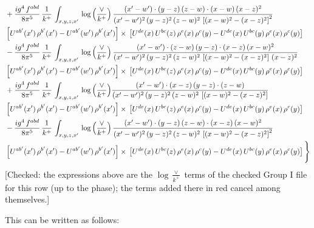 \documentclass[9pt]{article}
\numberwithin{equation}{section}
\begin{document}
\begin{align}
& +\frac{ig^{4}\, f^{abd}}{8\pi^{5}}\, \frac{1}{k^{+}}\, \int_{x,y,z,x'}\,\log{\left(\frac{\vee}{k^{+}}\right)}\,\frac{(x'-w')\cdot  (y-z)\, (z-w)\cdot (x-w)\, (x-z)^{2}}{(x'-w')^{2}\, (y-z)^{2}\, (z-w)^{2}\,\left[(x-w)^{2}-(x-z)^{2}\right]^{2}}\, \notag \\ & \left[U^{ab'}(x')\,\rho^{b'}(x')-U^{ab'}(w')\, \rho^{b'}(x')\right]\times\,\left[U^{de}(x)\,U^{bc}(z)\, \rho^{e}(x)\,\rho^{c}(y)-U^{de}(x)\,U^{bc}(y)\,\rho^{e}(x)\,\rho^{c}(y)\right] \notag \\
& - \frac{ig^{4}\, f^{abd}}{8\pi^{5}}\, \frac{1}{k^{+}}\, \int_{x,y,z,x'}\,\log{\left(\frac{\vee}{k^{+}}\right)}\,\frac{(x'-w')\cdot (z-w)\, (y-z)\cdot (x-z)\, (x-w)^{2}}{(x'-w')^{2}\, (y-z)^{2}\, (z-w)^{2}\,\left[(x-w)^{2} - (x-z)^{2}\right]\, (x-z)^{2}}\, \notag \\ & \left[U^{ab'}(x')\,\rho^{b'}(x')-U^{ab'}(w')\, \rho^{b'}(x')\right]\times\,\left[U^{de}(x)\,U^{bc}(z)\, \rho^{e}(x)\,\rho^{c}(y)-U^{de}(x)\,U^{bc}(y)\,\rho^{e}(x)\,\rho^{c}(y)\right] \notag \\
& +\frac{ig^{4}\, f^{abd}}{8\pi^{5}}\, \frac{1}{k^{+}}\, \int_{x,y,z,x'}\,\log{\left(\frac{\vee}{k^{+}}\right)}\frac{(x'-w')\cdot (x-z)\, (y-z)\cdot (z-w)}{(x'-w')^{2}\, (y-z)^{2}\, (z-w)^{2}\,\left[(x-w)^{2} -(x-z)^{2}\right]}\, \notag \\ & \left[U^{ab'}(x')\,\rho^{b'}(x')-U^{ab'}(w')\, \rho^{b'}(x')\right]\times\,\left[U^{de}(x)\,U^{bc}(z)\, \rho^{e}(x)\,\rho^{c}(y)-U^{de}(x)\,U^{bc}(y)\,\rho^{e}(x)\,\rho^{c}(y)\right] \notag \\
& -\frac{ig^{4}\, f^{abd}}{8\pi^{5}}\, \frac{1}{k^{+}}\, \int_{x,y,z,x'}\,\log{\left(\frac{\vee}{k^{+}}\right)}\,\frac{(x'-w')\cdot (y-z)\, (z-w)\cdot (x-z)\,(x-w)^{2}}{(x'-w')^{2}\, (y-z)^{2}\, (z-w)^{2}\,\left[(x-w)^{2}-(x-z)^{2}\right]^{2}}\, \notag \\ & \left[U^{ab'}(x')\,\rho^{b'}(x')-U^{ab'}(w')\, \rho^{b'}(x')\right]\times\,\left[U^{de}(x)\,U^{bc}(z)\, \rho^{e}(x)\,\rho^{c}(y)-U^{de}(x)\,U^{bc}(y)\,\rho^{e}(x)\,\rho^{c}(y)\right]\Bigg\}
\end{align} {\color{red}[Checked: the expressions above are the $\log\frac{\vee}{k^{+}}$ terms of the checked Group I file for this row (up to the phase); the terms added there in red cancel among themselves.]}\par\noindent 
This can be written as follows: 
\end{document}
